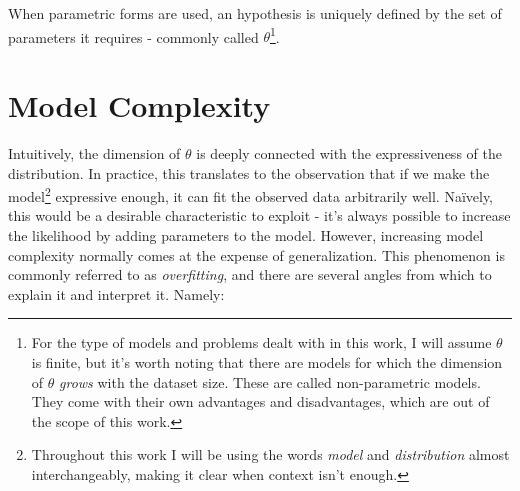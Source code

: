 When parametric forms are used, an hypothesis is uniquely defined by the set of
parameters it requires - commonly called $\theta$\footnote{For the type of models
and problems dealt with in this work, I will assume $\theta$ is finite, but it's
worth noting that there are models for which the dimension of $\theta$ \emph{grows}
with the dataset size. These are called non-parametric models. They come with
their own advantages and disadvantages, which are out of the scope of this work.}.

\section{Model Complexity}
\label{section:modelcomplexity}
Intuitively, the dimension of $\theta$ is deeply connected with the expressiveness
of the distribution. In practice, this translates to the observation that if we
make the model\footnote{Throughout this work I will be using the words \emph{model}
and \emph{distribution} almost interchangeably, making it clear when context isn't
enough.} expressive enough, it can fit the observed data arbitrarily well. Naïvely,
this would be a desirable characteristic to exploit - it's always possible to increase
the likelihood by adding parameters to the model. However, increasing model
complexity normally comes at the expense of generalization. This phenomenon is
commonly referred to as \emph{overfitting}, and there are several
angles from which to explain it and interpret it. Namely:
